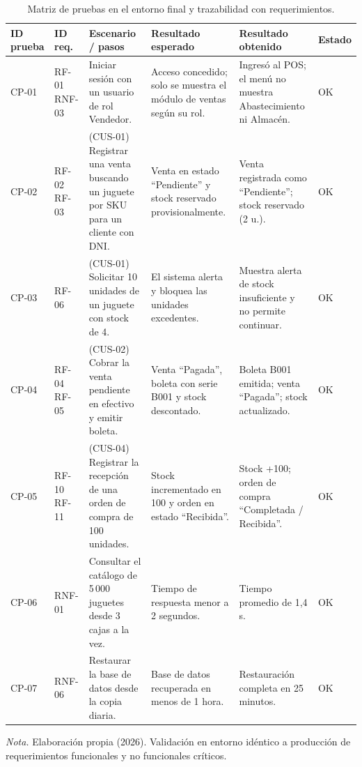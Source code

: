 \begin{table}[H]
  \centering
  \small
  \caption{Matriz de pruebas en el entorno final y trazabilidad con requerimientos.}
  \label{tab:despliegue_pruebas_finales}
  \begin{tabularx}{\linewidth}{|>{\centering\arraybackslash}p{1.2cm}|>{\centering\arraybackslash}p{1.4cm}|>{\raggedright\arraybackslash}X|>{\raggedright\arraybackslash}X|>{\raggedright\arraybackslash}X|>{\centering\arraybackslash}p{1.4cm}|}
    \hline
    \textbf{ID prueba} & \textbf{ID req.} & \textbf{Escenario / pasos} & \textbf{Resultado esperado} & \textbf{Resultado obtenido} & \textbf{Estado} \\ \hline
    CP-01 & RF-01 RNF-03 & Iniciar sesión con un usuario de rol Vendedor. & Acceso concedido; solo se muestra el módulo de ventas según su rol. & Ingresó al POS; el menú no muestra Abastecimiento ni Almacén. & OK \\ \hline
    CP-02 & RF-02 RF-03 & (CUS-01) Registrar una venta buscando un juguete por SKU para un cliente con DNI. & Venta en estado ``Pendiente'' y stock reservado provisionalmente. & Venta registrada como ``Pendiente''; stock reservado (2 u.). & OK \\ \hline
    CP-03 & RF-06 & (CUS-01) Solicitar 10 unidades de un juguete con stock de 4. & El sistema alerta y bloquea las unidades excedentes. & Muestra alerta de stock insuficiente y no permite continuar. & OK \\ \hline
    CP-04 & RF-04 RF-05 & (CUS-02) Cobrar la venta pendiente en efectivo y emitir boleta. & Venta ``Pagada'', boleta con serie B001 y stock descontado. & Boleta B001 emitida; venta ``Pagada''; stock actualizado. & OK \\ \hline
    CP-05 & RF-10 RF-11 & (CUS-04) Registrar la recepción de una orden de compra de 100 unidades. & Stock incrementado en 100 y orden en estado ``Recibida''. & Stock +100; orden de compra ``Completada / Recibida''. & OK \\ \hline
    CP-06 & RNF-01 & Consultar el catálogo de 5\,000 juguetes desde 3 cajas a la vez. & Tiempo de respuesta menor a 2 segundos. & Tiempo promedio de 1,4 s. & OK \\ \hline
    CP-07 & RNF-06 & Restaurar la base de datos desde la copia diaria. & Base de datos recuperada en menos de 1 hora. & Restauración completa en 25 minutos. & OK \\ \hline
  \end{tabularx}
  \par\vspace{0.2cm}
  {\raggedright \small \emph{Nota.} Elaboración propia (2026). Validación en entorno idéntico a producción de requerimientos funcionales y no funcionales críticos.\par}
\end{table}

